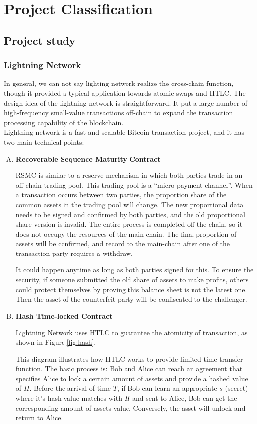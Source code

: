 \chapter{Project Classification} 
\label{chap:3}


\section{Project study}
\label{sec:ps}

\subsection{Lightning Network}
\noindent In general, we can not say lighting network realize the cross-chain function, though it provided a typical application towards atomic swaps and HTLC. The design idea of the lightning network is straightforward. It put a large number of high-frequency small-value transactions off-chain to expand the transaction processing capability of the blockchain.\\
\noindent Lightning network\cite{poon2016bitcoin} is a fast and scalable Bitcoin transaction project, and it has two main technical points:
\begin{enumerate}[A.]
    \item \textbf{Recoverable Sequence Maturity Contract} 
    
    	RSMC is similar to a reserve mechanism in which both parties trade in an
    	off-chain trading pool.  This trading pool is a ``micro-payment channel''.
    	When a transaction occurs between two parties, the proportion share of the
    	common assets in the trading pool will change. The new proportional data
    	needs to be signed and confirmed by both parties, and the old proportional
    	share version is invalid. The entire process is completed off the chain,
    	so it does not occupy the resources of the main chain. The final
    	proportion of assets will be confirmed, and record to the main-chain after
    	one of the transaction party requires a withdraw.
    	
    	It could happen anytime as long as both parties signed for this. To ensure
    	the security, if someone submitted the old share of assets to make
    	profits, others could protect themselves by proving this balance sheet is
    	not the latest one. Then the asset of the counterfeit party will be
    	confiscated to the challenger.
    \item \textbf{Hash Time-locked Contract}
    
     Lightning Network uses HTLC to guarantee the atomicity of transaction, as
     shown in Figure \ref{fig:hash}. 
     
     This diagram illustrates how HTLC works to
     provide limited-time transfer function. The basic process is: Bob and Alice
     can reach an agreement that specifies Alice to lock a certain amount of
     assets and provide a hashed value of $H$. Before the arrival of time $T$, if
     Bob can learn an appropriate $s$ (secret) where it's hash value matches with
     $H$ and sent to Alice, Bob can get the corresponding amount of assets value.
     Conversely, the asset will unlock and return to Alice.
\end{enumerate}
